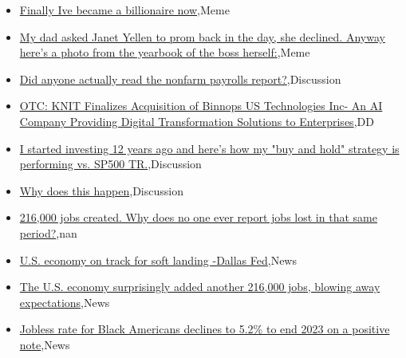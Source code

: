 \documentclass{article}%
\begin{document}
%
\begin{itemize}%
\item%
\href{https://reddit.com/r/wallstreetbets/comments/18zwegh/finally\_ive\_became\_a\_billionaire\_now/}{Finally Ive became a billionaire now},Meme%
\item%
\href{https://reddit.com/r/wallstreetbets/comments/18zw8xm/my\_dad\_asked\_janet\_yellen\_to\_prom\_back\_in\_the\_day/}{My dad asked Janet Yellen to prom back in the day, she declined. Anyway here's a photo from the yearbook of the boss herself:},Meme%
\item%
\href{https://reddit.com/r/wallstreetbets/comments/18zvcfa/did\_anyone\_actually\_read\_the\_nonfarm\_payrolls/}{Did anyone actually read the nonfarm payrolls report?},Discussion%
\item%
\href{https://reddit.com/r/Baystreetbets/comments/18z6ee4/otc\_knit\_finalizes\_acquisition\_of\_binnops\_us/}{OTC: KNIT Finalizes Acquisition of Binnops US Technologies Inc- An AI Company Providing Digital Transformation Solutions to Enterprises},DD%
\item%
\href{https://reddit.com/r/StockMarket/comments/18z8snf/i\_started\_investing\_12\_years\_ago\_and\_heres\_how\_my/}{I started investing 12 years ago and here's how my "buy and hold" strategy is performing vs. SP500 TR.},Discussion%
\item%
\href{https://reddit.com/r/StockMarket/comments/18z86tz/why\_does\_this\_happen/}{Why does this happen},Discussion%
\item%
\href{https://reddit.com/r/Economics/comments/18zmq1k/216000\_jobs\_created\_why\_does\_no\_one\_ever\_report/}{216,000 jobs created. Why does no one ever report jobs lost in that same period?},nan%
\item%
\href{https://reddit.com/r/Economics/comments/18zm8rd/us\_economy\_on\_track\_for\_soft\_landing\_dallas\_fed/}{U.S. economy on track for soft landing -Dallas Fed},News%
\item%
\href{https://reddit.com/r/Economics/comments/18zc3qu/the\_us\_economy\_surprisingly\_added\_another\_216000/}{The U.S. economy surprisingly added another 216,000 jobs, blowing away expectations},News%
\item%
\href{https://reddit.com/r/Economics/comments/18z9ygp/jobless\_rate\_for\_black\_americans\_declines\_to\_52/}{Jobless rate for Black Americans declines to 5.2\% to end 2023 on a positive note},News%
\end{itemize}%
\end{document}
